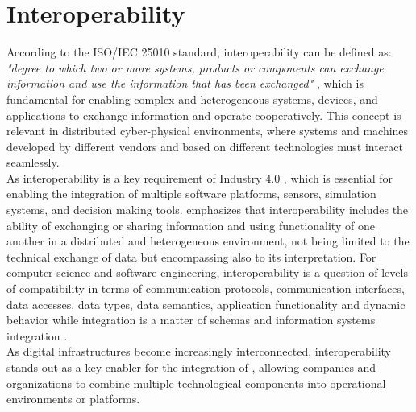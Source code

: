 \section{Interoperability}
\label{sec:interoperability}
According to the ISO/IEC 25010 standard, interoperability can be defined as: \textit{"degree to which two or more systems, products or components can exchange information and use the information that has been exchanged"} \cite{David2024}, 
which is fundamental for enabling complex and heterogeneous systems, devices, and applications to exchange information and
operate cooperatively. This concept is relevant in distributed cyber-physical environments, where systems and machines developed by
different vendors and based on different technologies must interact seamlessly.\\
As interoperability is a key requirement of Industry 4.0 \cite{Jacoby2020}, which is essential for enabling the integration of
multiple software platforms, sensors, simulation systems, and decision making tools.  emphasizes that
interoperability includes the ability of exchanging or sharing information and using functionality of one another in a distributed 
and heterogeneous environment, not being limited to the technical exchange of data but encompassing also to its interpretation. 
For computer science and software engineering, interoperability is a question of levels of compatibility in terms of communication 
protocols, communication interfaces, data accesses, data types, data semantics, application functionality and dynamic behavior while 
integration is a matter of \DB schemas and information systems integration \cite{Vernadat2010}.\\
As digital infrastructures become increasingly interconnected, interoperability stands out as a key enabler for the integration of 
\CPS, allowing companies and organizations to combine multiple technological components into operational 
environments or platforms.

